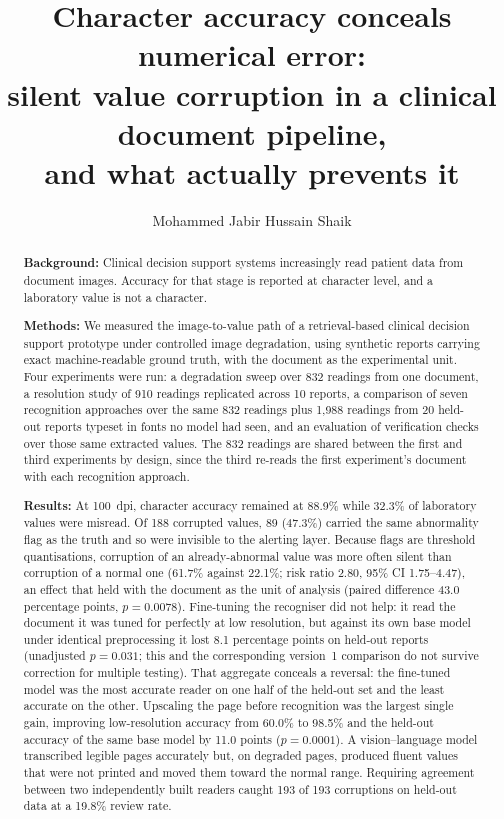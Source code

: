 \documentclass[11pt]{article}
\title{\vspace{-1.5em}\bfseries Character accuracy conceals numerical error:\\
silent value corruption in a clinical document pipeline,\\
and what actually prevents it}
\author[ ]{}
\affil[ ]{\small Author details withheld for double-blind review}
\author[ ]{Mohammed Jabir Hussain Shaik}
\affil[ ]{\small School of Electronics, Electrical Engineering and Computer Science\\
  Queen's University Belfast, United Kingdom\\
  \texttt{mshaik01@qub.ac.uk}}
\date{}
\begin{document}
\maketitle

\begin{abstract}
\noindent
\textbf{Background:} Clinical decision support systems increasingly read patient data from
document images. Accuracy for that stage is reported at character level, and a laboratory value
is not a character.

\noindent \textbf{Methods:} We measured the image-to-value path of a retrieval-based clinical
decision support prototype under controlled image degradation, using synthetic reports carrying
exact machine-readable ground truth, with the document as the experimental unit. Four experiments were run: a degradation sweep over 832 readings from one
document, a resolution study of 910 readings replicated across 10 reports, a comparison of seven
recognition approaches over the same 832 readings plus 1{,}988 readings from 20 held-out reports
typeset in fonts no model had seen, and an evaluation of verification checks over those same
extracted values. The 832 readings are shared between the first and third experiments by design,
since the third re-reads the first experiment's document with each recognition approach.

\noindent \textbf{Results:} At 100~dpi, character accuracy remained at 88.9\% while 32.3\% of
laboratory values were misread. Of 188 corrupted values, 89 (47.3\%) carried the same
abnormality flag as the truth and so were invisible to the alerting layer. Because flags are
threshold quantisations, corruption of an already-abnormal value was more often silent than
corruption of a normal one (61.7\% against 22.1\%; risk ratio 2.80, 95\% CI 1.75--4.47), an
effect that held with the document as the unit of analysis (paired difference 43.0 percentage
points, $p = 0.0078$). Fine-tuning the recogniser did not help: it read the document it was
tuned for perfectly at low resolution, but against its own base model under identical
preprocessing it lost 8.1 percentage points on held-out reports (unadjusted $p = 0.031$; this
and the corresponding version~1 comparison do not survive correction for multiple testing). That
aggregate conceals a reversal: the fine-tuned model was the most accurate reader on one half of
the held-out set and the least accurate on the other. Upscaling the
page before recognition was the largest single gain, improving low-resolution accuracy from
60.0\% to 98.5\% and the held-out accuracy of the same base model by 11.0 points
($p = 0.0001$). A vision--language model transcribed legible
pages accurately but, on degraded pages, produced fluent values that were not printed and moved
them toward the normal range. Requiring agreement between two independently built readers caught
193 of 193 corruptions on held-out data at a 19.8\% review rate.


\end{abstract}
\end{document}
